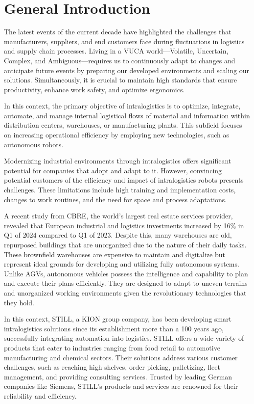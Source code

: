 \chapter*{General Introduction}
The latest events of the current decade have highlighted the challenges that manufacturers, suppliers, and end customers
face during fluctuations in logistics and supply chain processes. Living in a VUCA world—Volatile, Uncertain, Complex,
and Ambiguous—requires us to continuously adapt to changes and anticipate future events by preparing our developed
environments and scaling our solutions. Simultaneously, it is crucial to maintain high standards that ensure productivity,
enhance work safety, and optimize ergonomics. 


In this context, the primary objective of intralogistics is to optimize, integrate, automate, and manage internal 
logistical flows of material and information within distribution centers, warehouses, or manufacturing plants. 
This subfield focuses on increasing operational efficiency by employing new technologies, such as autonomous robots. 

Modernizing industrial environments through intralogistics offers significant potential for companies that adopt and adapt 
to it. However, convincing potential customers of the efficiency and impact of intralogistics robots presents challenges. 
These limitations include high training and implementation costs, changes to work routines, and the need for space and 
process adaptations. 


A recent study from CBRE, the world’s largest real estate services provider, revealed that European industrial and 
logistics investments increased by 16\% in Q1 of 2024 compared to Q1 of 2023. Despite this, many warehouses are old, 
repurposed buildings that are unorganized due to the nature of their daily tasks. These brownfield warehouses are 
expensive to maintain and digitalize but represent ideal grounds for developing and utilizing fully autonomous systems. 
Unlike AGVs, autonomous vehicles possess the intelligence and capability to plan and execute their plans efficiently. 
They are designed to adapt to uneven terrains and unorganized working environments given the revolutionary technologies 
that they hold. 

In this context, STILL, a KION group company, has been developing smart intralogistics solutions since 
its establishment more than a 100 years ago, successfully integrating automation into logistics. STILL offers a wide 
variety of products that cater to industries ranging from food retail to automotive manufacturing and chemical sectors. 
Their solutions address various customer challenges, such as reaching high shelves, order picking, palletizing, 
fleet management, and providing consulting services. Trusted by leading German companies like Siemens, STILL's products 
and services are renowned for their reliability and efficiency. 

